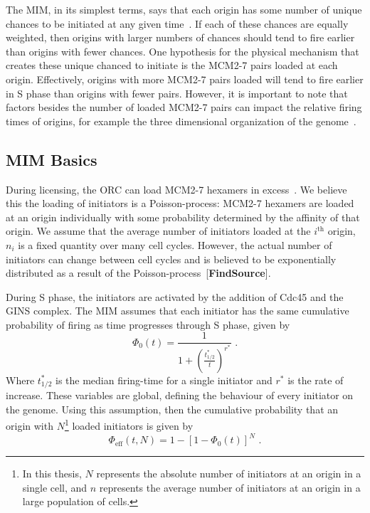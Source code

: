 	The MIM, in its simplest terms, says that each origin has some number of unique chances to be initiated at any given time~\cite{ScottsThesis}.
	If each of these chances are equally weighted, then origins with larger numbers of chances should tend to fire earlier than origins with fewer chances.
	One hypothesis for the physical mechanism that creates these unique chanced to initiate is the MCM2-7 pairs loaded at each origin.
	Effectively, origins with more MCM2-7 pairs loaded will tend to fire earlier in S phase than origins with fewer pairs.
	However, it is important to note that factors besides the number of loaded MCM2-7 pairs can impact the relative firing times of origins, for example the three dimensional organization of the genome~\cite{}.
	
		\subsection{MIM Basics}
		\label{subsec:MIMBasics}
		During licensing, the ORC can load MCM2-7 hexamers in excess~\cite{MultiMCM}.
		We believe this the loading of initiators is a Poisson-process:
		MCM2-7 hexamers are loaded at an origin individually with some probability determined by the affinity of that origin.
		We assume that the average number of initiators loaded at the $i^{\text{th}}$ origin, $n_i$ is a fixed quantity over many cell cycles.
		However, the actual number of initiators can change between cell cycles and is believed to be exponentially distributed as a result of the Poisson-process~[\textbf{FindSource}].
		
		During S phase, the initiators are activated by the addition of Cdc45 and the GINS complex.
		The MIM assumes that each initiator has the same cumulative probability of firing as time progresses through S phase, given by
		\begin{equation}\label{eq:CPDInitiator}
			\Phi_0(t) = \frac{1}{1+\left(\frac{t^*_{1/2}}{t}\right)^{r^*}}\text{ .}
		\end{equation}
		Where $t^*_{1/2}$ is the median firing-time for a single initiator and $r^*$ is the rate of increase.
		These variables are global, defining the behaviour of every initiator on the genome.
		Using this assumption, then the cumulative probability that an origin with $N$\footnote{In this thesis, $N$ represents the absolute number of initiators at an origin in a single cell, and $n$ represents the average number of initiators at an origin in a large population of cells.} loaded initiators is given by
		\begin{equation} \label{eq:CPDEffectiveN}
			\Phi_{\text{eff}}(t,N) = 1 - \left[1 - \Phi_0(t)\right]^N\text{ .}
		\end{equation}
	
